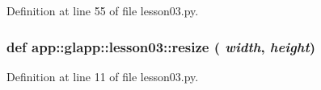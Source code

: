 Definition at line 55 of file lesson03.py.
\subsubsection{\setlength{\rightskip}{0pt plus 5cm}def app::glapp::lesson03::resize ( {\em width},  {\em height})}\label{namespaceapp_1_1glapp_1_1lesson03_67ae81b8fa66d4a486c56405b80060cd}




Definition at line 11 of file lesson03.py.